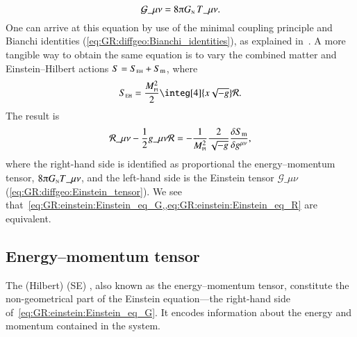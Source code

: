\begin{equation}\label{eq:GR:einstein:Einstein_eq_G}
    \mathcal{G}\_{\mu\nu} = 8 \ppi G\nped{N} \, T\_{\mu\nu}.
\end{equation}
One can arrive at this equation by use of the minimal coupling principle and Bianchi identities (\cref{eq:GR:diffgeo:Bianchi_identities}), as explained in~\citet[Ch.~4]{carrollSpacetimeGeometryIntroduction2019}. %
A more tangible way to obtain the same equation is to vary the combined matter and Einstein--Hilbert actions $S =S_{\text{\tiny{EH}}} + S_\mathrm{m}$, where~\citep{carrollSpacetimeGeometryIntroduction2019}
\begin{equation}
    S\nped{EH} =  \frac{M\nped{Pl}^2}{2} \integ[4]{x\sqrt{-g} } \mathcal{R}.
\end{equation}
The result is~\citep{carrollSpacetimeGeometryIntroduction2019}
\begin{equation}\label{eq:GR:einstein:Einstein_eq_R}
    \mathcal{R}\_{\mu\nu} - \frac{1}{2}g\_{\mu\nu} \mathcal{R}= - \frac{1}{M\nped{Pl}^2} \frac{2}{\sqrt{-g}}\Fdv{S\ped{m}}{g\^{\mu\nu}},
\end{equation}
where the right-hand side is identified as proportional the energy--momentum tensor, $8\piGN T\_{\mu\nu}$, and the left-hand side is the Einstein tensor $\mathcal{G}\_{\mu\nu}$ (\cref{eq:GR:diffgeo:Einstein_tensor}). We see that~\cref{eq:GR:einstein:Einstein_eq_G,,eq:GR:einstein:Einstein_eq_R} are equivalent. %


\subsection{Energy--momentum tensor}\label{sec:GR:einstein:SE_tensor}
    The (Hilbert)  (SE) , also known as the energy--momentum tensor, constitute the non-geometrical part of the Einstein equation---the right-hand side of~\cref{eq:GR:einstein:Einstein_eq_G}. It encodes information about the energy and momentum contained in the system.

